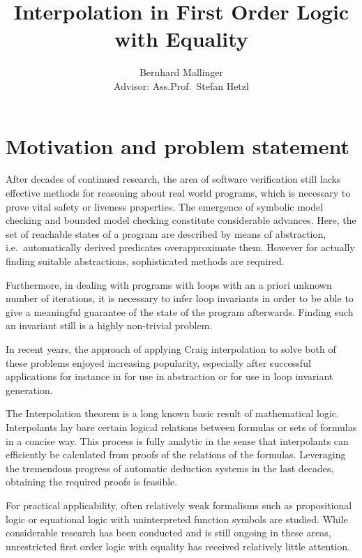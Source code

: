 \documentclass[,%
			paper=a4,%
			DIV11, %
			liststotoc,
			bibtotoc,
			draft=false,%
			numbers=noendperiod
			]{scrartcl}
\title{Interpolation in First Order Logic with Equality}
\author{Bernhard Mallinger\medskip \\
Advisor: Ass.Prof.\ Stefan Hetzl}
\begin{document}
\maketitle

\section{Motivation and problem statement}
\label{motivation}

After decades of continued research, the area of software verification still lacks effective methods for reasoning about real world programs, which is necessary to prove vital safety or liveness properties.
The emergence of symbolic model checking and bounded model checking constitute considerable advances.
Here, the set of reachable states of a program are described by means of abstraction, i.e.\ automatically derived predicates overapproximate them.
However for actually finding suitable abstractions, sophisticated methods are required.

Furthermore, in dealing with programs with loops with an a priori unknown number of iterations, it is necessary to infer loop invariants in order to be able to give a meaningful guarantee of the state of the program afterwards. Finding such an invariant still is a highly non-trivial problem.

In recent years, the approach of applying Craig interpolation to solve both of these problems enjoyed increasing popularity, especially after successful applications for instance in \cite{McMillan03} for use in abstraction or \cite{weissenbacher2010} for use in loop invariant generation.

The Interpolation theorem is a long known basic result of mathematical logic.
Interpolants lay bare certain logical relations between formulas or sets of formulas in a concise way. 
This process is fully analytic in the sense that interpolants can efficiently be calculated from proofs of the relations of the formulas.
Leveraging the tremendous progress of automatic deduction systems in the last decades, obtaining the required proofs is feasible.

For practical applicability, often relatively weak formalisms such as propositional logic or equational logic with uninterpreted function symbols are studied. 
While considerable research has been conducted and is still ongoing in these areas, unrestricted first order logic with equality has received relatively little attention. 


\end{document}
